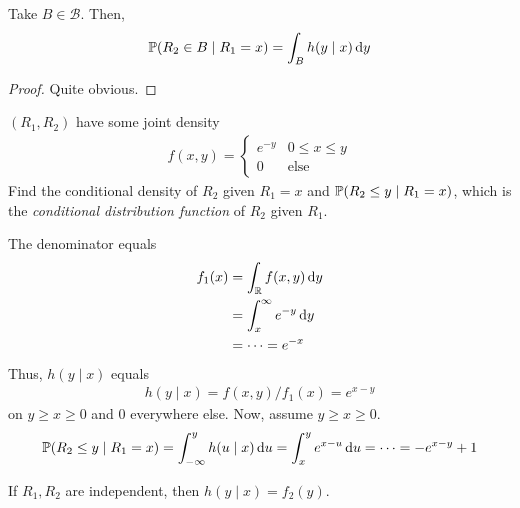 \begin{lemma}
    Take $B \in \mathcal{B}$. Then,
    \begin{align}
        \mathbb{P}(R_2 \in B \mid R_1 = x) = \int_B h(y \mid x) \dd{y}
    \end{align}
\end{lemma}
\begin{proof}
    Quite obvious.
\end{proof}

\begin{example}
    $(R_1,R_2)$ have some joint density
    \begin{align}
        f(x,y) = \begin{cases}
            e^{-y} & 0 \le x \le y\\
            0 & \text{else}
        \end{cases}
    \end{align}
    Find the conditional density of $R_2$ given $R_1 = x$ and $\mathbb{P}(R_2 \le y \mid R_1 = x)$, which is the \textit{conditional distribution function} of $R_2$ given $R_1$.
\end{example}
\begin{solution}
    The denominator equals
    \begin{align}
        f_1(x) &= \int_{\mathbb{R}} f(x,y) \dd{y}\\
        &= \int_x^\infty e^{-y} \dd{y}\\
        &= \cdots = e^{-x}
    \end{align}
    Thus, $h(y \mid x)$ equals
    \begin{align}
        h(y \mid x) = f(x,y) / f_1(x) = e^{x - y}
    \end{align}
    on $y \ge x \ge 0$ and $0$ everywhere else. Now, assume $y \ge x \ge 0$.
    \begin{align}
        \mathbb{P}(R_2 \le y \mid R_1 = x) = \int_{-\infty}^y h(u \mid x) \dd{u} = \int_x^y e^{x-u} \dd{u} = \cdots = -e^{x-y} + 1
    \end{align}
\end{solution}

\begin{aside}
    If $R_1,R_2$ are independent, then $h(y \mid x) = f_2(y)$.
\end{aside}

